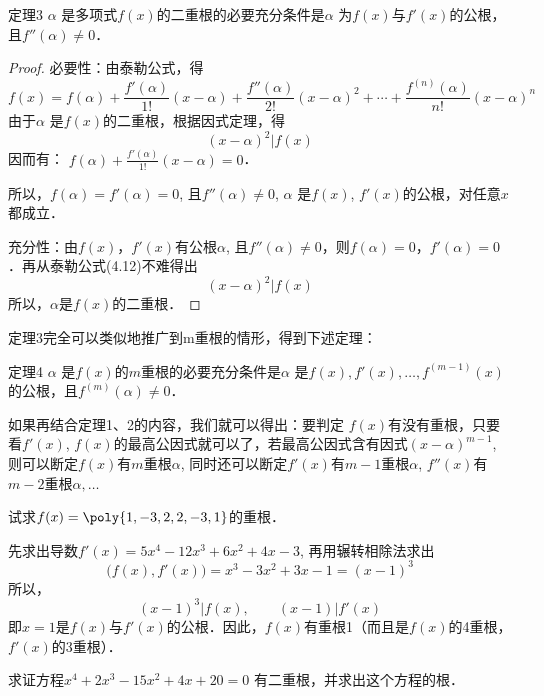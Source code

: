 \begin{blk}{定理3}
    $\alpha$ 是多项式$f(x)$的二重根的必要充分条件是$\alpha$ 为$f(x)$与$f'(x)$的公根，且$f''(\alpha )\ne 0$．
\end{blk}

\begin{proof}
    必要性：由泰勒公式，得
\begin{equation}
    f(x)=f(\alpha)+\frac{f'(\alpha)}{1!}(x-\alpha)+\frac{f''(\alpha)}{2!}(x-\alpha)^2+\cdots+\frac{f^{(n)}(\alpha)}{n!}(x-\alpha)^n
\end{equation}
由于$\alpha$ 是$f(x)$的二重根，根据因式定理，得
\[(x-\alpha )^2|f (x) \]
因而有：
$f (\alpha ) +\frac{f' (\alpha )}{1!} (x-\alpha )=0$．

所以，$f(\alpha )=f'(\alpha )=0$, 且$f''(\alpha )\ne 0$, $\alpha$ 是$f(x)$, $f'(x)$的公根，对任意$x$都成立．

充分性：由$f(x)$，$f'(x)$有公根$\alpha$, 且$f''(\alpha )\ne 0$，则$f(\alpha)= 0$，$f'(\alpha)=0$．再从泰勒公式(4.12)不难得出
\[(x-\alpha )^2|f (x) \]
所以，$\alpha$是$f(x)$的二重根．
\end{proof}

定理3完全可以类似地推广到m重根的情形，得到下述定理：

\begin{blk}{定理4}
    $\alpha$ 是$f(x)$的$m$重根的必要充分条件是$\alpha$ 是$f(x),f'(x),\ldots,f^{(m-1)}(x)$的公根，且$f^{(m)}(\alpha )\ne 0$．
\end{blk}

如果再结合定理1、2的内容，我们就可以得出：要判定
$f(x)$有没有重根，只要看$f'(x)$, $f(x)$的最高公因式就可以了，若最高公因式含有因式$(x-\alpha )^{m-1}$, 则可以断定$f(x)$有$m$重根$\alpha$, 同时还可以断定$f'(x)$有$m-1$重根$\alpha$, $f''(x)$有$m-2$重根$\alpha,\ldots$


\begin{example}
    试求$f(x)=\poly{1,-3,2,2,-3,1}$的重根．
\end{example}

\begin{solution}
    先求出导数$f' (x) =5x^4-12x^3+6x^2+4x-3$,
再用辗转相除法求出
\[\big(f (x) ,f' (x) \big) =x^3-3x^2+3x-1= (x-1)^3\]
所以，
\[(x-1)^3|f(x),\qquad (x-1)|f'(x)\]
即$x=1$是$f(x)$与$f'(x)$的公根．因此，$f(x)$有重根1（而且是$f(x)$的4重根，$f'(x)$的3重根）．
\end{solution}

\begin{example}
  求证方程$x^4+2x^3-15x^2+4x+20=0$
有二重根，并求出这个方程的根．  
\end{example}

